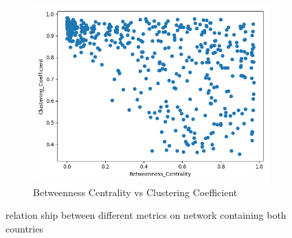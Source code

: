 \begin{figure}[H]
\begin{subfigure}[b]{0.3\textwidth}
     \end{subfigure}
     \hfill
     \begin{subfigure}[b]{0.3\textwidth}
         \centering
         \includegraphics[width=\textwidth]{images/comparison/ALL/relationship_Betweenness_Centrality_vs_Clustering_Coefficient_ALL.png}
         \caption{Betweenness Centrality vs Clustering Coefficient}
     \end{subfigure}
        \caption{relation ship between different metrics on network containing both countries}
        \label{fig:ALL3}
\end{figure}

